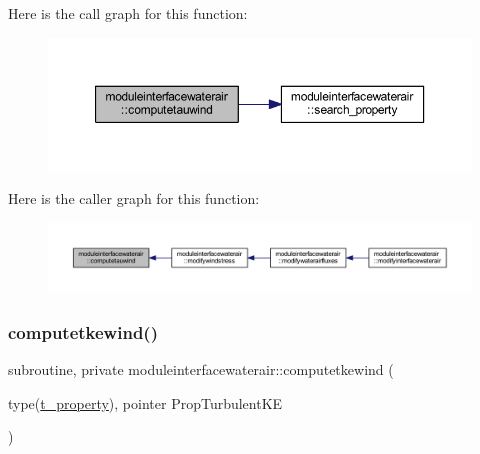 Here is the call graph for this function\+:\nopagebreak
\begin{figure}[H]
\begin{center}
\leavevmode
\includegraphics[width=350pt]{namespacemoduleinterfacewaterair_aa8b103904b5c34125450b64aeff53081_cgraph}
\end{center}
\end{figure}
Here is the caller graph for this function\+:\nopagebreak
\begin{figure}[H]
\begin{center}
\leavevmode
\includegraphics[width=350pt]{namespacemoduleinterfacewaterair_aa8b103904b5c34125450b64aeff53081_icgraph}
\end{center}
\end{figure}
\mbox{\label{namespacemoduleinterfacewaterair_afa753f72a101e83d20369a3801986adb}} 
\subsubsection{\texorpdfstring{computetkewind()}{computetkewind()}}
{\footnotesize\ttfamily subroutine, private moduleinterfacewaterair\+::computetkewind (\begin{DoxyParamCaption}\item[{type(\mbox{\hyperlink{structmoduleinterfacewaterair_1_1t__property}{t\+\_\+property}}), pointer}]{Prop\+Turbulent\+KE }\end{DoxyParamCaption})\hspace{0.3cm}{\ttfamily [private]}}

